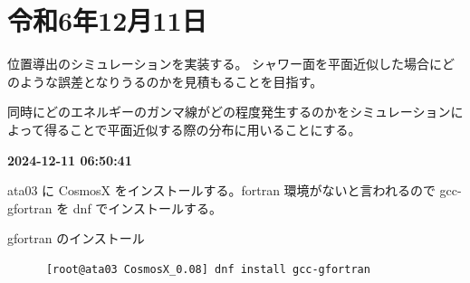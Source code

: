 
\section{令和6年12月11日}

位置導出のシミュレーションを実装する。
シャワー面を平面近似した場合にどのような誤差となりうるのかを見積もることを目指す。

同時にどのエネルギーのガンマ線がどの程度発生するのかをシミュレーションによって得ることで平面近似する際の分布に用いることにする。

{\bf 2024-12-11 06:50:41}

ata03 に CosmosX をインストールする。fortran 環境がないと言われるので gcc-gfortran を dnf でインストールする。

\begin{codebox}{gfortran のインストール}
   \begin{verbatim}
      [root@ata03 CosmosX_0.08] dnf install gcc-gfortran
   \end{verbatim}
\end{codebox}